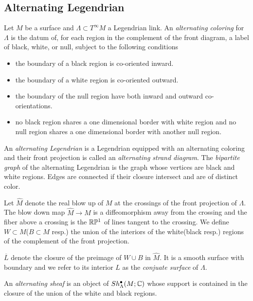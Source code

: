 \subsection*{Alternating Legendrian}
\begin{definition}
Let $M$ be a surface and $\Lambda \subset T^{\infty}M$ a Legendrian link. An \emph{alternating coloring} for $\Lambda$ is the datum of, for each region in the complement of the front diagram, a label of black, white, or null, subject to the following conditions
\begin{itemize}
\item the boundary of a black region is co-oriented inward.
\item the boundary of a white region is co-oriented outward.
\item the boundary of the null region have both inward and outward co-orientations.
\item no black region shares a one dimensional border with white region and no null region shares a one dimensional border with another null region.
\end{itemize}
An \emph{alternating Legendrian} is a Legendrian equipped with an alternating coloring and their front projection is called an \emph{alternating strand diagram}. The \emph{bipartite graph} of the alternating Legendrian is the graph whose vertices are black and white regions. Edges are connected if their closure intersect and are of distinct color.
\end{definition}
Let $\hat{M}$ denote the real blow up of $M$ at the crossings of the front projection of $\Lambda$. The blow down map $\hat{M}\rightarrow M$ is a diffeomorphism away from the crossing and the fiber above a crossing is the $\mathbb{R} \mathbb{P}^1$ of lines tangent to the crossing. We define $W\subset M$($B\subset M$ resp.) the union of the interiors of the white(black resp.) regions of the complement of the front projection.

\begin{definition}
$\overline{L}$ denote the closure of the preimage of $W\cup B$ in $\hat{M}$. It is a smooth surface with boundary and we refer to its interior $L$ as the \emph{conjuate surface} of $\Lambda$.
\end{definition}

\begin{definition}
An \emph{alternating sheaf} is an object of $Sh^\bullet_\Lambda(M;\mathbb{C})$ whose support is contained in the closure of the union of the white and black regions.
\end{definition}

